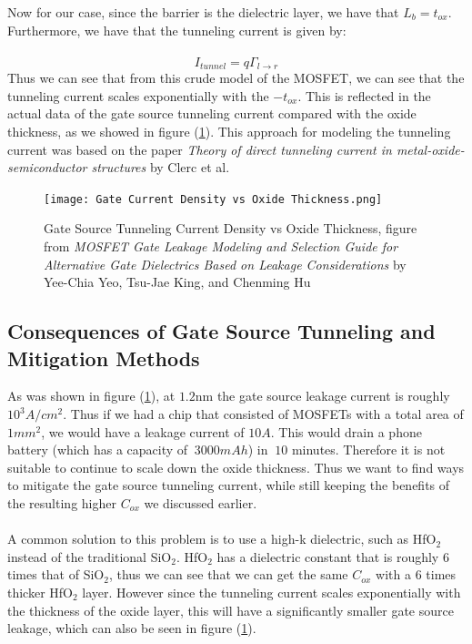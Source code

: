 \documentclass[
  reprint,
  amsmath,amssymb,
  aps
]{revtex4-1}
\begin{document}
Now for our case, since the barrier is the dielectric layer, we have that $L_b = t_{ox}$. Furthermore, we have that the tunneling current is given by:\\\\
\begin{equation}
    I_{tunnel} = q\Gamma_{l\rightarrow r}
\end{equation}
Thus we can see that from this crude model of the MOSFET, we can see that the tunneling current scales exponentially with the
$-t_{ox}$. This is reflected in the actual data of the gate source tunneling current compared with the oxide thickness, as
we showed in figure (\ref{fig: gate source tunneling current}). This approach for modeling the tunneling current was based 
on the paper \textit{Theory of direct tunneling current in metal-oxide-semiconductor structures} by Clerc et al. \cite{Clerc}
\begin{figure}[H]
    \centering
    \texttt{[image: Gate Current Density vs Oxide Thickness.png]}
    \caption{Gate Source Tunneling Current Density vs Oxide Thickness, figure from \textit{MOSFET Gate Leakage Modeling and Selection
    Guide for Alternative Gate Dielectrics
    Based on Leakage Considerations} by Yee-Chia Yeo, Tsu-Jae King, and Chenming Hu \cite{Yeo}}
    \label{fig: gate source tunneling current}
\end{figure}

\subsection{\label{sec:level2}Consequences of Gate Source Tunneling and Mitigation Methods}
As was shown in figure (\ref{fig: gate source tunneling current}), at $1.2$nm the gate source leakage current is 
roughly $10^{3} A/cm^2$. Thus if we had a chip that consisted of MOSFETs with a total area of $1mm^2$,
 we would have a leakage current of $10A$. This would drain a 
phone battery (which has a capacity of $~3000mAh$) in $~10$ minutes. Therefore it is not suitable to continue to 
scale down the oxide thickness. Thus we want to find ways to mitigate the gate source tunneling current, while 
still keeping the benefits of the resulting higher $C_{ox}$ we discussed earlier.\\\\
A common solution to this problem is to use a high-k dielectric,\cite{ChenmingHu7} such as HfO$_2$ instead of the traditional SiO$_2$. HfO$_2$ has 
a dielectric constant that is roughly $6$ times that of SiO$_2$, thus we can see that we can get the same $C_{ox}$ with a 
6 times thicker HfO$_2$ layer. However since the tunneling current scales exponentially with the thickness of the oxide layer,
this will have a significantly smaller gate source leakage, which can also be seen in figure (\ref{fig: gate source tunneling current}).
\end{document}

